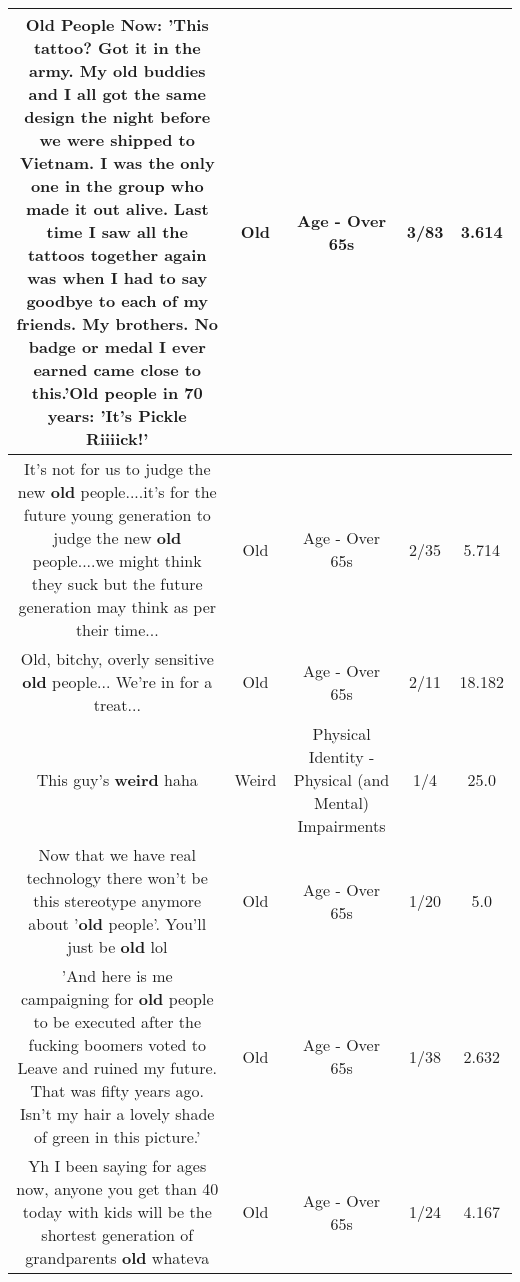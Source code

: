 \documentclass[11pt]{article}
\newlength\mylength
\begin{document}
\begin{center}
\begin{longtable}{|C{.65\mylength}|C{.30\mylength}|C{.12\mylength}|C{.12\mylength}|C{.12\mylength}|}
  \small Old People Now: 'This tattoo? Got it in the army. My \textbf{old} buddies and I all got the same design the night before we were shipped to Vietnam. I was the only one in the group who made it out alive. Last time I saw all the tattoos together again was when I had to say goodbye to each of my friends. My brothers. No badge or medal I ever earned came close to this.'\textbf{Old} people in 70 years: 'It's Pickle Riiiick!'\normalsize   & Old & Age - Over 65s & 3/83 & 3.614 \\  \hline
  \small It's not for us to judge the new \textbf{old} people....it's for the future young generation to judge the new \textbf{old} people....we might think they suck but the future generation may think as per their time...\normalsize   & Old & Age - Over 65s & 2/35 & 5.714 \\  \hline
  \small Old, bitchy, overly sensitive \textbf{old} people... We're in for a treat...\normalsize   & Old & Age - Over 65s & 2/11 & 18.182 \\  \hline
  \small This guy's \textbf{weird} haha\normalsize   & Weird & Physical Identity - Physical (and Mental) Impairments & 1/4 & 25.0 \\  \hline
  \small Now that we have real technology there won't be this stereotype anymore about '\textbf{old} people'. You'll just be \textbf{old} lol\normalsize   & Old & Age - Over 65s & 1/20 & 5.0 \\  \hline
  \small 'And here is me campaigning for \textbf{old} people to be executed after the fucking boomers voted to Leave and ruined my future. That was fifty years ago. Isn't my hair a lovely shade of green in this picture.'\normalsize   & Old & Age - Over 65s & 1/38 & 2.632 \\  \hline
  \small Yh I been saying for ages now, anyone you get than 40 today with kids will be the shortest generation of grandparents \textbf{old} whateva\normalsize   & Old & Age - Over 65s & 1/24 & 4.167 \\  \hline

\end{longtable}
\end{center}
\end{document}
